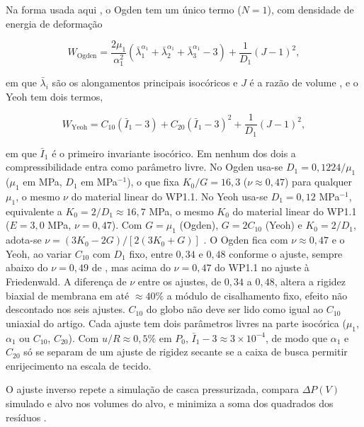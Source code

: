Na forma usada aqui \citep{dhondt2022manual}, o Ogden tem um único termo ($N=1$), com densidade de energia de deformação
 
\begin{equation}
W_{\text{Ogden}}=\frac{2\mu_1}{\alpha_1^2}\left(\bar\lambda_1^{\alpha_1}+\bar\lambda_2^{\alpha_1}+\bar\lambda_3^{\alpha_1}-3\right)+\frac{1}{D_1}(J-1)^2,
\label{eq:ogden}
\end{equation}
 
em que $\bar\lambda_i$ são os alongamentos principais isocóricos e $J$ é a razão de volume \citep{holzapfel2000}, e o Yeoh tem dois termos,
 
\begin{equation}
W_{\text{Yeoh}}=C_{10}\left(\bar I_1-3\right)+C_{20}\left(\bar I_1-3\right)^2+\frac{1}{D_1}(J-1)^2,
\label{eq:yeoh}
\end{equation}
 
em que $\bar I_1$ é o primeiro invariante isocórico. Em nenhum dos dois a compressibilidade entra como parâmetro livre. No Ogden usa-se $D_1=0{,}1224/\mu_1$ ($\mu_1$ em MPa, $D_1$ em MPa$^{-1}$), o que fixa $K_0/G=16{,}3$ ($\nu\approx0{,}47$) para qualquer $\mu_1$, o mesmo $\nu$ do material linear do WP1.1. No Yeoh usa-se $D_1=0{,}12$ MPa$^{-1}$, equivalente a $K_0=2/D_1\approx16{,}7$ MPa, o mesmo $K_0$ do material linear do WP1.1 ($E=3{,}0$ MPa, $\nu=0{,}47$). Com $G=\mu_1$ (Ogden), $G=2C_{10}$ (Yeoh) e $K_0=2/D_1$, adota-se $\nu=(3K_0-2G)/[2(3K_0+G)]$ \citep{holzapfel2000}. O Ogden fica com $\nu\approx0{,}47$ e o Yeoh, ao variar $C_{10}$ com $D_1$ fixo, entre $0{,}34$ e $0{,}48$ conforme o ajuste, sempre abaixo do $\nu=0{,}49$ de \citet{park2021sclera}, mas acima do $\nu=0{,}47$ do WP1.1 no ajuste à Friedenwald. A diferença de $\nu$ entre os ajustes, de $0{,}34$ a $0{,}48$, altera a rigidez biaxial de membrana em até $\approx40\%$ a módulo de cisalhamento fixo, efeito não descontado nos seis ajustes. $C_{10}$ do globo não deve ser lido como igual ao $C_{10}$ uniaxial do artigo. Cada ajuste tem dois parâmetros livres na parte isocórica ($\mu_1$, $\alpha_1$ ou $C_{10}$, $C_{20}$). Com $u/R\approx0{,}5\%$ em $P_0$, $\bar I_1-3\approx3\times10^{-4}$, de modo que $\alpha_1$ e $C_{20}$ só se separam de um ajuste de rigidez secante se a caixa de busca permitir enrijecimento na escala de tecido.
 
O ajuste inverso repete a simulação de casca pressurizada, compara $\Delta P(V)$ simulado e alvo nos volumes do alvo, e minimiza a soma dos quadrados dos resíduos \citep{branch1999,virtanen2020scipy,kling2014airpuff,bronte2021airpuff}.
 

